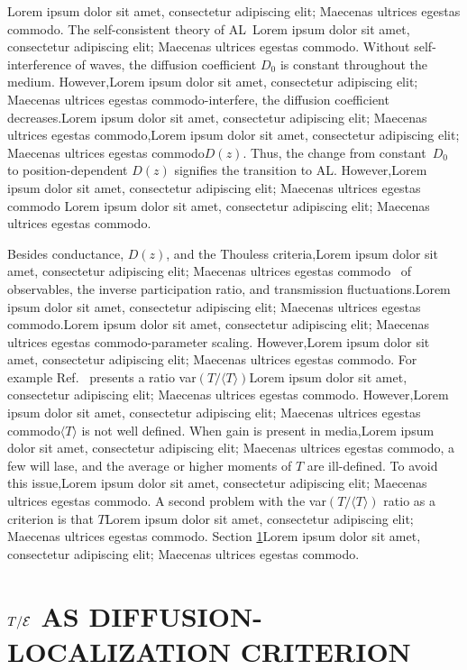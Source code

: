 Lorem ipsum dolor sit amet, consectetur adipiscing elit; Maecenas ultrices egestas commodo. The self-consistent theory of AL~\cite{1980_Vollhardt_Wolfle}Lorem ipsum dolor sit amet, consectetur adipiscing elit; Maecenas ultrices egestas commodo. Without self-interference of waves, the diffusion coefficient $D_0$ is constant throughout the medium. However,Lorem ipsum dolor sit amet, consectetur adipiscing elit; Maecenas ultrices egestas commodo-interfere, the diffusion coefficient decreases.Lorem ipsum dolor sit amet, consectetur adipiscing elit; Maecenas ultrices egestas commodo,Lorem ipsum dolor sit amet, consectetur adipiscing elit; Maecenas ultrices egestas commodo$D(z)$. Thus, the change from constant~$D_0$ to position-dependent $D(z)$ signifies the transition to AL. However,Lorem ipsum dolor sit amet, consectetur adipiscing elit; Maecenas ultrices egestas commodo%
Lorem ipsum dolor sit amet, consectetur adipiscing elit; Maecenas ultrices egestas commodo.

Besides conductance, $D(z)$, and the Thouless criteria,Lorem ipsum dolor sit amet, consectetur adipiscing elit; Maecenas ultrices egestas commodo~\cite{2005_Yamilov_correlations} of observables, the inverse participation ratio, and transmission fluctuations.Lorem ipsum dolor sit amet, consectetur adipiscing elit; Maecenas ultrices egestas commodo.Lorem ipsum dolor sit amet, consectetur adipiscing elit; Maecenas ultrices egestas commodo-parameter scaling. However,Lorem ipsum dolor sit amet, consectetur adipiscing elit; Maecenas ultrices egestas commodo. For example Ref.~\cite{2000_chabanov_nature} presents a ratio var$(T/\langle T \rangle)$Lorem ipsum dolor sit amet, consectetur adipiscing elit; Maecenas ultrices egestas commodo. However,Lorem ipsum dolor sit amet, consectetur adipiscing elit; Maecenas ultrices egestas commodo$\langle T \rangle$ is not well defined. When gain is present in media,Lorem ipsum dolor sit amet, consectetur adipiscing elit; Maecenas ultrices egestas commodo, a few will lase, and the average or higher moments of $T$ are ill-defined. To avoid this issue,Lorem ipsum dolor sit amet, consectetur adipiscing elit; Maecenas ultrices egestas commodo. A second problem with the var$(T/\langle T \rangle)$ ratio as a criterion is that $T$Lorem ipsum dolor sit amet, consectetur adipiscing elit; Maecenas ultrices egestas commodo. Section \ref{sec:te_ratio_candidate}Lorem ipsum dolor sit amet, consectetur adipiscing elit; Maecenas ultrices egestas commodo.

\section{\texorpdfstring{$T/{\cal E}$}{T/E} AS DIFFUSION-LOCALIZATION CRITERION}
\label{sec:te_ratio_candidate}

